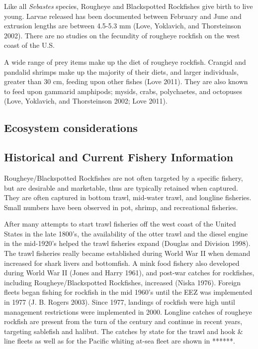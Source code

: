\documentclass[
]{scrartcl}
\begin{document}
Like all \emph{Sebastes} species, Rougheye and Blackspotted Rockfishes
give birth to live young. Larvae released has been documented between
February and June and extrusion lengths are between 4.5-5.3 mm (Love,
Yoklavich, and Thorsteinson 2002). There are no studies on the fecundity
of rougheye rockfish on the west coast of the U.S.

A wide range of prey items make up the diet of rougheye rockfish.
Crangid and pandalid shrimps make up the majority of their diets, and
larger individuals, greater than 30 cm, feeding upon other fishes (Love
2011). They are also known to feed upon gammarid amphipods; mysids,
crabs, polychaetes, and octopuses (Love, Yoklavich, and Thorsteinson
2002; Love 2011).

\subsection{Ecosystem considerations}\label{ecosystem-considerations}

\subsection{Historical and Current Fishery
Information}\label{historical-and-current-fishery-information}

Rougheye/Blackspotted Rockfishes are not often targeted by a specific
fishery, but are desirable and marketable, thus are typically retained
when captured. They are often captured in bottom trawl, mid-water trawl,
and longline fisheries. Small numbers have been observed in pot, shrimp,
and recreational fisheries.

After many attempts to start trawl fisheries off the west coast of the
United States in the late 1800's, the availability of the otter trawl
and the diesel engine in the mid-1920's helped the trawl fisheries
expand (Douglas and Division 1998). The trawl fisheries really became
established during World War II when demand increased for shark livers
and bottomfish. A mink food fishery also developed during World War II
(Jones and Harry 1961), and post-war catches for rockfishes, including
Rougheye/Blackspotted Rockfishes, increased (Niska 1976). Foreign fleets
began fishing for rockfish in the mid 1960's until the EEZ was
implemented in 1977 (J. B. Rogers 2003). Since 1977, landings of
rockfish were high until management restrictions were implemented in
2000. Longline catches of rougheye rockfish are present from the turn of
the century and continue in recent years, targeting sablefish and
halibut. The catches by state for the trawl and hook \& line fleets as
well as for the Pacific whiting at-sea fleet are shown in ******.
\end{document}
